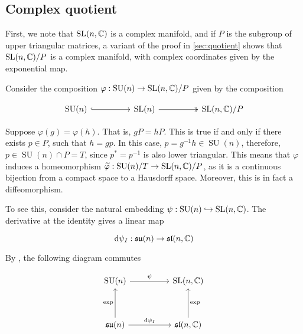 \documentclass{article}
\DeclareMathOperator{\SU}{SU}
\newcommand{\su}{\mathfrak{su}}
\renewcommand{\sl}{\mathfrak{sl}}
\renewcommand{\tilde}{\widetilde}
\begin{document}
\subsection{Complex quotient}

First, we note that \(\operatorname{SL}(n, \mathbb{C})\) is a complex manifold, and if \(P\) is the subgroup of upper triangular matrices, a variant of the proof in \cref{sec:quotient} shows that \(\operatorname{SL}(n, \mathbb{C})/P\) is a complex manifold, with complex coordinates given by the exponential map.

Consider the composition \(\varphi : \SU(n) \to \SL(n, \C)/P\) given by the composition 

\[\begin{tikzcd}
	{\SU(n)} && {\SL(n)} && {\SL(n, \C)/P}
	\arrow[hook, from=1-1, to=1-3]
	\arrow[two heads, from=1-3, to=1-5]
\end{tikzcd}\]

Suppose \(\varphi(g) = \varphi(h)\). That is, \(gP = hP\). This is true if and only if there exists \(p \in P\), such that \(h = gp\). In this case, \(p = g^{-1}h \in \SU(n)\), therefore, \(p \in \SU(n) \cap P = T\), since \(p^* = p^{-1}\) is also lower triangular. This means that \(\varphi\) induces a homeomorphism \(\tilde\varphi : \SU(n)/T \to \SL(n, \C)/P\), as it is a continuous bijection from a compact space to a Hausdorff space. Moreover, this is in fact a diffeomorphism.

To see this, consider the natural embedding \(\psi : \SU(n) \hookrightarrow \SL(n, \C)\). The derivative at the identity gives a linear map

\[\dd\psi_I : \su(n) \to \sl(n, \C)\]

By \cite[Theorem 3.32]{warner}, the following diagram commutes

\[\begin{tikzcd}[ampersand replacement=\&]
	{\SU(n)} \&\& {\SL(n,\C)} \\
	\\
	{\su(n)} \&\& {\sl(n, \C)}
	\arrow["{\dd\psi_I}", from=3-1, to=3-3]
	\arrow["\psi", from=1-1, to=1-3]
	\arrow["\exp", from=3-1, to=1-1]
	\arrow["\exp"', from=3-3, to=1-3]
\end{tikzcd}\]
\end{document}
